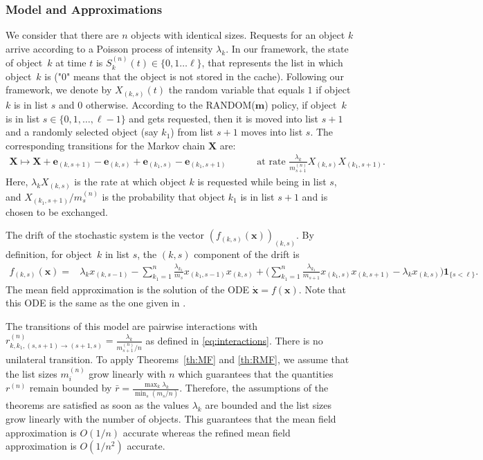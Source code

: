 \documentclass[acmsmall]{acmart}
\newcommand\bx{\mathbf{x}}
\newcommand\be{\mathbf{e}}
\newcommand\bm{\mathbf{m}}
\newcommand\bX{\mathbf{X}}
\newcommand\toN{^{(n)}}
\newcommand\Sn{S\toN}
\begin{document}

\subsubsection{Model and Approximations}

We consider that there are $n$ objects with identical sizes. Requests for an object $k$ arrive according to a Poisson process of intensity $\lambda_k$. In our framework, the state of object~$k$ at time $t$ is $\Sn_k(t)\in\{0,1\dots \ell\}$, that represents the list in which  object~$k$ is ("0" means that the object is not stored in the cache). Following our framework, we denote by $X_{(k,s)}(t)$ the random variable that equals $1$ if object $k$ is in list $s$ and $0$ otherwise.  According to the RANDOM($\bm$) policy, if object~$k$ is in list $s\in \{0,1, \ldots, \ell-1\}$ and gets requested, then it is moved into list $s+1$ and a randomly selected object (say $k_1$) from list $s+1$ moves into list $s$.  The corresponding transitions for the Markov chain $\bX$ are: 
\begin{align}
  \bX \mapsto \bX + \be_{(k,s+1)} - \be_{(k,s)} + \be_{(k_1,s)} - \be_{(k_1,s+1)} & \qquad \text{ at rate } \frac{\lambda_k}{m_{s+1}\toN} X_{(k,s)}X_{(k_1,s+1)}. \label{eq:rand_m:transition}
\end{align}
Here, $\lambda_kX_{(k,s)}$ is the rate at which object $k$ is requested while being in list $s$, and $X_{(k_1,s+1)}/m_s\toN$ is the probability that object $k_1$ is in list $s+1$ and is chosen to be exchanged.

The drift of the stochastic system is the vector $(f_{(k,s)}(\bx))_{(k,s)}$. By definition, for object~$k$ in list $s$, the $(k,s)$ component of the drift is 
\begin{align*}
f_{(k,s)}(\bx) = & \lambda_k x_{(k,s-1)} - \sum_{k_1=1}^n\frac{\lambda_{k_1}}{m_s} x_{(k_1,s-1)}x_{(k,s)} + \bigl( \sum_{k_1=1}^n \frac{\lambda_{k_1}}{m_{s+1}} x_{(k_1,s)}x_{(k,s+1)} - \lambda_k x_{(k,s)} \bigr)\mathbf{1}_{\{s < \ell\}}.
\end{align*}
The mean field approximation is the solution of the ODE $\dot{\bx}=f(\bx)$. Note that this ODE is the same as the one given in \cite{gastTransientSteadystateRegime2015}.

The transitions of this model are pairwise interactions with $r\toN_{k,k_1,(s,s+1)\rightarrow(s+1,s)} = \frac{\lambda_k}{m\toN_{s+1}/n}$ as defined in \eqref{eq:interactions}. There is no unilateral transition. To apply Theorems~\ref{th:MF} and \ref{th:RMF}, we assume that the list sizes $m_i\toN$ grow linearly with $n$ which guarantees that the quantities $r\toN$ remain bounded by $\bar{r} = \frac{\max_k \lambda_k}{\min_s (m_s/n)}$. Therefore, the assumptions of the theorems are satisfied as soon as the values $\lambda_k$ are bounded and the list sizes grow linearly with the number of objects.  This guarantees that the mean field approximation is $O(1/n)$ accurate whereas the refined mean field approximation is $O(1/n^2)$ accurate. 
\end{document}
